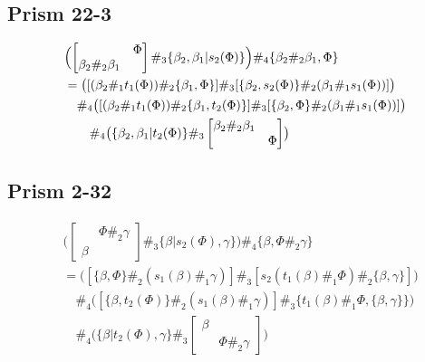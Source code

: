 \documentclass[11pt, reqno]{amsart} %
\theoremstyle{definition}
\theoremstyle{remark}
\numberwithin{equation}{section}
\begin{document}
\subsection{Prism 22-3}
\begin{align}
  \nonumber
  &\Bigl(
    \begin{bmatrix} & \Phi \\ \beta_2\#_2\beta_1 &\end{bmatrix}
    \#_3
    \{\beta_2,\beta_1|s_2(\Phi)\}
  \Bigr)
  \#_4
  \{\beta_2\#_2\beta_1,\Phi\} \\
  \nonumber
  &= 
  \bigl(
    [(\beta_2\#_1t_1(\Phi))\#_2\{\beta_1,\Phi\}]
    \#_3
    [\{\beta_2,s_2(\Phi)\}\#_2(\beta_1\#_1s_1(\Phi))]
  \bigr) \\
  \nonumber
  &\quad \#_4
  \bigl(
    [(\beta_2\#_1t_1(\Phi))\#_2\{\beta_1,t_2(\Phi)\}]
    \#_3
    [\{\beta_2,\Phi\}\#_2(\beta_1\#_1s_1(\Phi))]
  \bigr) \\
  \label{eq:Prism22|3}
  &\qquad \#_4
  \bigl(
    \{\beta_2,\beta_1|t_2(\Phi)\}
    \#_3
    \begin{bmatrix} \beta_2\#_2\beta_1 & \\ & \Phi \end{bmatrix}
  \bigr)
\end{align}

\subsection{Prism 2-32}
\begin{align}
  \nonumber
  &
  \bigl(
    \begin{bmatrix}& \Phi\#_2\gamma \\ \beta &\end{bmatrix}
    \#_3
    \{\beta|s_2(\Phi),\gamma\}
  \bigr)
  \#_4
  \{\beta,\Phi\#_2\gamma\} \\
  \nonumber
  &= 
  \bigl(
    [\{\beta,\Phi\}\#_2(s_1(\beta)\#_1\gamma)]
    \#_3
    [s_2(t_1(\beta)\#_1\Phi)\#_2\{\beta,\gamma\}]
  \bigr) \\
  \nonumber
  &\quad 
  \#_4\bigl(
    [\{\beta,t_2(\Phi)\}\#_2(s_1(\beta)\#_1\gamma)]
    \#_3
    \{t_1(\beta)\#_1\Phi,\{\beta,\gamma\}\}
  \bigr) \\
  \label{eq:Prism2|3|2}
  &\quad \#_4
  \bigl(
    \{\beta|t_2(\Phi),\gamma\}
    \#_3
    \begin{bmatrix} \beta & \\ & \Phi\#_2\gamma\end{bmatrix}
  \bigr)
\end{align}
\end{document}

